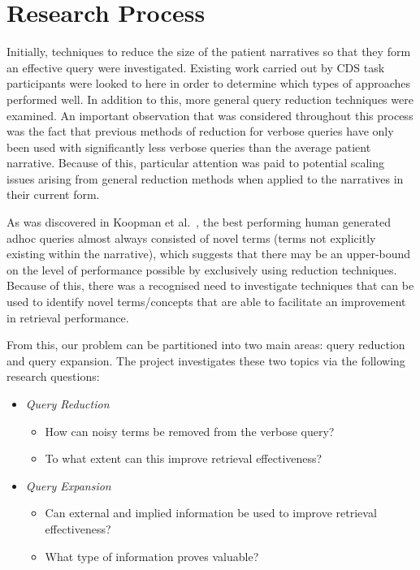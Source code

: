 \documentclass[a4paper]{report}
\begin{document}
\section{Research Process}

Initially, techniques to reduce the size of the patient narratives so that they form an effective query were investigated. Existing work carried out by CDS task participants were looked to here in order to determine which types of approaches performed well. In addition to this, more general query reduction techniques were examined. An important observation that was considered throughout this process was the fact that previous methods of reduction for verbose queries have only been used with significantly less verbose queries than the average patient narrative. Because of this, particular attention was paid to potential scaling issues arising from general reduction methods when applied to the narratives in their current form.

As was discovered in Koopman et al.~\cite{koopman2017generating}, the best performing human generated adhoc queries almost always consisted of novel terms (terms not explicitly existing within the narrative), which suggests that there may be an upper-bound on the level of performance possible by exclusively using reduction techniques. Because of this, there was a recognised need to investigate techniques that can be used to identify novel terms/concepts that are able to facilitate an improvement in retrieval performance. 

From this, our problem can be partitioned into two main areas: query reduction and query expansion. The project investigates these two topics via the following research questions:

\begin{itemize}
  \item \textit{Query Reduction}
    \begin{itemize}
      \item How can noisy terms be removed from the verbose query?
      \item To what extent can this improve retrieval effectiveness?
    \end{itemize}
  \item \textit{Query Expansion}
    \begin{itemize}
      \item Can external and implied information be used to improve retrieval effectiveness?
      \item What type of information proves valuable?
    \end{itemize}
\end{itemize}
\end{document}
